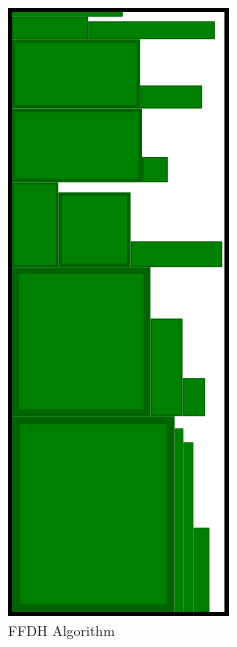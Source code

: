 \documentclass{article}
\begin{document}
\begin{figure}[ht]
\centering
\begin{subfigure}{.35\textwidth}
  \centering
  \includegraphics[width=.5\linewidth]{FFDHrun.png}
  \caption{FFDH Algorithm}
  \label{fig:ffdhrun}
\end{subfigure}%
\begin{subfigure}{.35\textwidth}
  \centering

\end{subfigure}
\end{figure}
\end{document}
